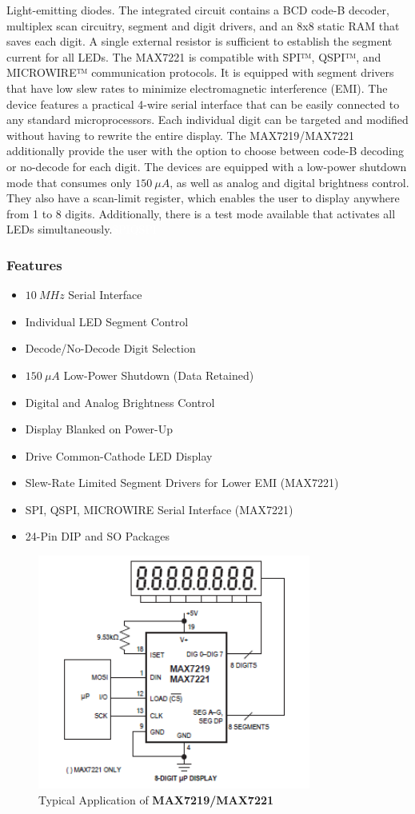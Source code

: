 Light-emitting diodes. The integrated circuit contains a BCD code-B decoder, multiplex scan circuitry, segment and digit drivers, and an 8x8 static RAM that saves each digit. A single external resistor is sufficient to establish the segment current for all LEDs. The MAX7221 is compatible with \gls{SPI}™, \gls{QSPI}™, and \gls{MICROWIRE}™ communication protocols. It is equipped with segment drivers that have low slew rates to minimize electromagnetic interference (EMI).
The device features a practical 4-wire serial interface that can be easily connected to any standard microprocessors. Each individual digit can be targeted and modified without having to rewrite the entire display. The MAX7219/MAX7221 additionally provide the user with the option to choose between code-B decoding or no-decode for each digit.
The devices are equipped with a low-power shutdown mode that consumes only $\SI{150}{\mu A}$, as well as analog and digital brightness control. They also have a scan-limit register, which enables the user to display anywhere from 1 to 8 digits. Additionally, there is a test mode available that activates all LEDs simultaneously.{\tiny \textcolor{white}{\ac{SPI}}}{\tiny \textcolor{white}{\ac{QSPI}}}
\subsubsection*{Features}
\begin{itemize}
    \item $\SI{10}{MHz}$ Serial Interface
    \item Individual LED Segment Control
    \item Decode/No-Decode Digit Selection
    \item $\SI{150}{\mu A}$ Low-Power Shutdown (Data Retained)
    \item Digital and Analog Brightness Control
    \item Display Blanked on Power-Up
    \item Drive Common-Cathode LED Display
    \item Slew-Rate Limited Segment Drivers
for Lower EMI (MAX7221)
    \item SPI, QSPI, MICROWIRE Serial Interface (MAX7221)
    \item 24-Pin DIP and SO Packages
\end{itemize}

\begin{figure}[H]
    \centering
    \includegraphics[width=0.8\textwidth]{Files/Images/Max7219.png}
    \caption{Typical Application of \textbf{MAX7219/MAX7221}}
    \label{Max7219}
\end{figure}


